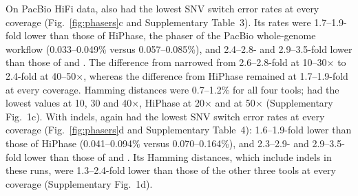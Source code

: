 On PacBio HiFi data, \toolname also had the lowest SNV switch error rates at every coverage (Fig.~\ref{fig:phasers}c and Supplementary Table~3). Its rates were 1.7--1.9-fold lower than those of HiPhase\cite{holt2024hiphase}, the phaser of the PacBio whole-genome workflow (0.033--0.049\% versus 0.057--0.085\%), and 2.4--2.8- and 2.9--3.5-fold lower than those of \whatshap and \hapcut. The difference from \whatshap narrowed from 2.6--2.8-fold at 10--30$\times$ to 2.4-fold at 40--50$\times$, whereas the difference from HiPhase remained at 1.7--1.9-fold at every coverage. Hamming distances were 0.7--1.2\% for all four tools; \toolname had the lowest values at 10, 30 and 40$\times$, HiPhase at 20$\times$ and \whatshap at 50$\times$ (Supplementary Fig.~1c). With indels, \toolname again had the lowest SNV switch error rates at every coverage (Fig.~\ref{fig:phasers}d and Supplementary Table~4): 1.6--1.9-fold lower than those of HiPhase (0.041--0.094\% versus 0.070--0.164\%), and 2.3--2.9- and 2.9--3.5-fold lower than those of \whatshap and \hapcut. Its Hamming distances, which include indels in these runs, were 1.3--2.4-fold lower than those of the other three tools at every coverage (Supplementary Fig.~1d).

